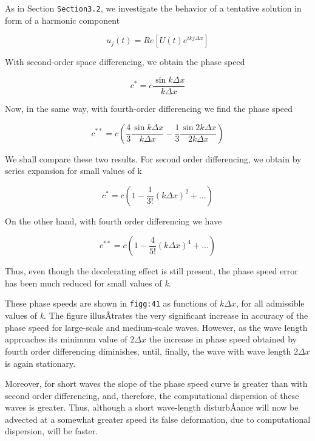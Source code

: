 As in Section \texttt{Section3.2}, we investigate the behavior of a
tentative solution in form of a harmonic component

\[u_j( t ) = Re\left\lbrack U\left( t \right)e^{ikj\Delta x} \right\rbrack\]

With second-order space differencing, we obtain the phase speed

\[c^{*} = c\frac{\sin{k \Delta x}}{k \Delta x}\]

Now, in the same way, with fourth-order differencing we find the phase
speed

{\[c^{**} = c\left( \frac{4}{3}\frac{\sin{k\Delta x}}{k \Delta x} 
- \frac{1}{3}\frac{\sin{2k\Delta x}}{2k\Delta x} \right)\]}

We shall compare these two results. For second order differencing, we
obtain by series expansion for small values of k

\[c^{*} = c\left( 1 - \frac{1}{3!}\left( k\Delta x \right)^{2} + \ldots \right)\]

On the other hand, with fourth order differencing we have

\[c^{**} = c\left( 1 - \frac{4}{5!}\left( k\Delta x \right)^{4} + \ldots \right)\]

Thus, even though the decelerating effect is still present, the phase
speed error has been much reduced for small values of \emph{k}.

These phase speeds are shown in \texttt{figg:41} as functions of
\(k\Delta x\), for all admissible values of \emph{k}. The figure
illusÂ­trates the very significant increase in accuracy of the phase
speed for large-scale and medium-scale waves. However, as the wave
length approaches its minimum value of \(2\Delta x\) the increase in
phase speed obtained by fourth order differencing diminishes, until,
finally, the wave with wave length \(2\Delta x\) is again stationary.

\begin{figure}
\centering
{}
\caption{}
\end{figure}

Moreover, for short waves the slope of the phase speed curve is greater
than with second order differencing, and, therefore, the computational
dispersion of these waves is greater. Thus, although a short wave-length
disturbÂ­ance will now be advected at a somewhat greater speed its false
deformation, due to computational dispersion, will be faster.

